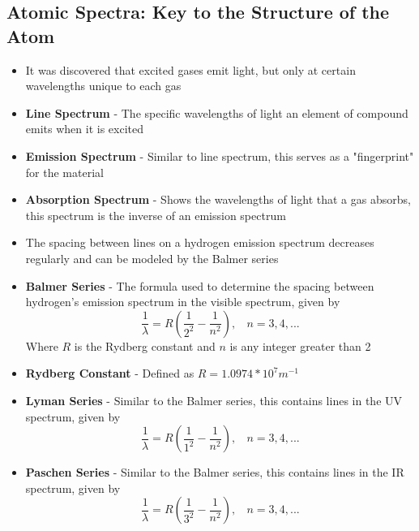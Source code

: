\subsection{Atomic Spectra: Key to the Structure of the Atom}
\begin{itemize}
    \item It was discovered that excited gases emit light, but only at certain wavelengths unique to each gas
    \item \textbf{Line Spectrum} - The specific wavelengths of light an element of compound emits when it is excited
    \item \textbf{Emission Spectrum} - Similar to line spectrum, this serves as a "fingerprint" for the material 
    \item \textbf{Absorption Spectrum} - Shows the wavelengths of light that a gas absorbs, this spectrum is the inverse of an emission spectrum
    \item The spacing between lines on a hydrogen emission spectrum decreases regularly and can be modeled by the Balmer series
    \item \textbf{Balmer Series} - The formula used to determine the spacing between hydrogen's emission spectrum in the visible spectrum, given by \[\frac{1}{\lambda}=R(\frac{1}{2^2}-\frac{1}{n^2}),\ \ \ \ n=3,4,...\] Where \(R\) is the Rydberg constant and \(n\) is any integer greater than 2
    \item \textbf{Rydberg Constant} - Defined as \(R=1.0974*10^7m^{-1}\)
    \item \textbf{Lyman Series} - Similar to the Balmer series, this contains lines in the UV spectrum, given by \[\frac{1}{\lambda}=R(\frac{1}{1^2}-\frac{1}{n^2}),\ \ \ \ n=3,4,...\]
    \item \textbf{Paschen Series} - Similar to the Balmer series, this contains lines in the IR spectrum, given by \[\frac{1}{\lambda}=R(\frac{1}{3^2}-\frac{1}{n^2}),\ \ \ \ n=3,4,...\]
\end{itemize}

